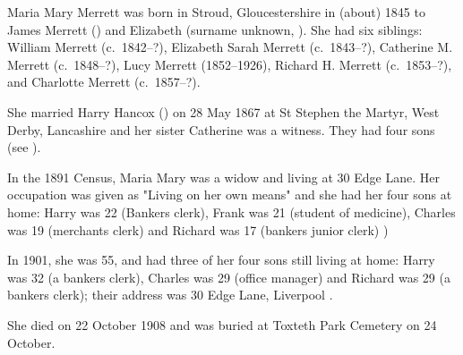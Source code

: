 
Maria Mary Merrett was born in Stroud, Gloucestershire in (about) 1845 to James Merrett () and Elizabeth (surname unknown, ).
She had  six siblings: William Merrett (c.~1842--?), Elizabeth Sarah Merrett (c.~1843--?), Catherine M. Merrett (c.~1848--?), Lucy Merrett (1852--1926), Richard H. Merrett (c.~1853--?), and Charlotte Merrett (c.~1857--?).

She married Harry Hancox () on 28 May 1867 at St Stephen the Martyr, West Derby, Lancashire \cite{MariaMerrettMarriage} and her sister Catherine was a witness. They had four sons (see ).

In the 1891 Census, Maria Mary was a widow and living at 30 Edge Lane. Her occupation was given as "Living on her own means" and she had her four sons at home: Harry was 22 (Bankers clerk), Frank was 21 (student of medicine), Charles was 19 (merchants clerk) and Richard was 17 (bankers junior clerk) \cite{MariaMerrettOccupation})

In 1901, she was 55, and had three of her four sons still living at home: Harry was 32 (a bankers clerk), Charles was 29 (office manager) and Richard was 29 (a bankers clerk); their address was 30 Edge Lane, Liverpool \cite{MariaMerrettResidence}.

She died on 22 October 1908 and was buried at Toxteth Park Cemetery on 24 October. \cite{MariaMerrettDeath}
